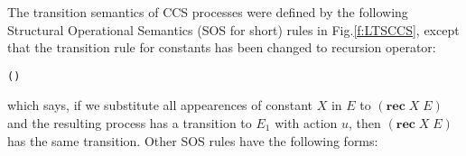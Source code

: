 The transition semantics of CCS processes were defined by the following
Structural Operational Semantics (SOS for short) rules in
Fig.\;\ref{f:LTSCCS}, except that the transition rule for constants
has been changed to recursion operator:
\begin{alltt}
\HOLTokenTurnstile{}   (  )  \HOLTokenTransBegin{}\HOLTokenTransEnd {} \HOLSymConst{\HOLTokenImp{}}    \HOLTokenTransBegin{}\HOLTokenTransEnd {}
\end{alltt}
which says, if we substitute all appearences of constant $X$ in $E$ to
$(\mathbf{rec}\; X\; E)$ and the resulting process has a transition to $E_1$
with action $u$, then $(\mathbf{rec}\; X\; E)$ has the same
transition. Other SOS rules have the following forms:
